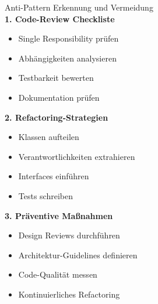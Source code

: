 \begin{KR}{Anti-Pattern Erkennung und Vermeidung}\\
\textbf{1. Code-Review Checkliste}
\begin{itemize}
    \item Single Responsibility prüfen
    \item Abhängigkeiten analysieren
    \item Testbarkeit bewerten
    \item Dokumentation prüfen
\end{itemize}

\textbf{2. Refactoring-Strategien}
\begin{itemize}
    \item Klassen aufteilen
    \item Verantwortlichkeiten extrahieren
    \item Interfaces einführen
    \item Tests schreiben
\end{itemize}

\textbf{3. Präventive Maßnahmen}
\begin{itemize}
    \item Design Reviews durchführen
    \item Architektur-Guidelines definieren
    \item Code-Qualität messen
    \item Kontinuierliches Refactoring
\end{itemize}
\end{KR}